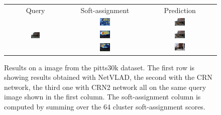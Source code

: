 \documentclass[10pt,twocolumn,letterpaper]{article}
\begin{document}
\begin{figure}
   \centering
   \setlength{\tabcolsep}{-0.1pt}   
   \addtolength{\tabcolsep}{-0.1pt} 
   \def\arraystretch{0.2}
   \begin{tabular}{ccc}
      Query & Soft-assignment & Prediction\\
            & \includegraphics[width=0.15\textwidth]{img/results/29/29_NETVLAD_Cam_On_Image.png} & \includegraphics[width=0.15\textwidth]{img/results/29/29_NETVLAD_best_pred.png}\\
      \includegraphics[width=0.15\textwidth]{img/results/29/29_query.png} & \includegraphics[width=0.15\textwidth]{img/results/29/29_CRN_Cam_On_Image.png} &  \includegraphics[width=0.15\textwidth]{img/results/29/29_CRN_best_pred.png}\\
            & \includegraphics[width=0.15\textwidth]{img/results/29/29_CRN2_Cam_On_Image.png}    & \includegraphics[width=0.15\textwidth]{img/results/29/29_CRN2_best_pred.png}
   \end{tabular}
   \caption{Results on a image from the pitts30k dataset. The first row is showing results obtained with NetVLAD, the second with the CRN network, the third one with CRN2 network all on the same query image shown in the first column.
   The soft-assignment column is computed by summing over the 64 cluster soft-assignment scores. }
   \label{fig:visual}
\end{figure}
	
\end{document}
